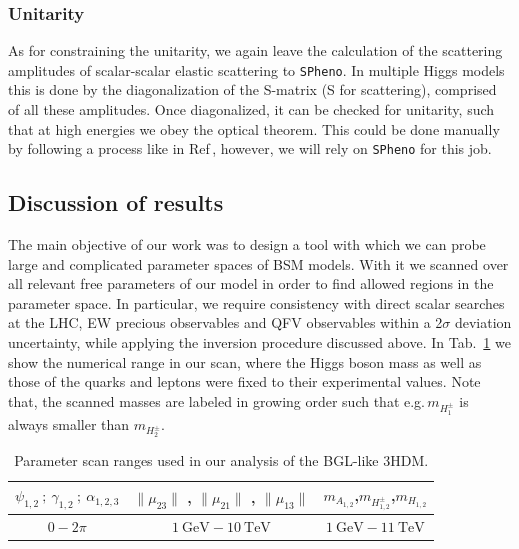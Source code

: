 \documentclass[10pt]{report}
\begin{document}
\subsubsection{Unitarity}

As for constraining the unitarity, we again leave the calculation of the scattering amplitudes of scalar-scalar elastic scattering to \texttt{SPheno}. 
%
In multiple Higgs models this is done by the diagonalization of the S-matrix (S for scattering), comprised of all these amplitudes.
%
Once diagonalized, it can be checked for unitarity, such that at high energies we obey the optical theorem.  
%
This could be done manually by following a process like in Ref\,\cite{Moretti_2015}, however, we will rely on \texttt{SPheno} for this job.

\subsection{Discussion of results}

The main objective of our work was to design a tool with which we can probe large and complicated parameter spaces of BSM models. 
%
With it we scanned over all relevant free parameters of our model in order to find allowed regions in the parameter space.
%
In particular, we require consistency with direct scalar searches at the LHC, EW precious observables and QFV observables within a 2$\sigma$ deviation uncertainty, while applying the inversion procedure discussed above. 
%
In Tab.~\ref{Tab:Generic_3HDM_tab} we show the numerical range in our scan, where the Higgs boson mass as well as those of the quarks and leptons were fixed to their experimental values. 
%
Note that, the scanned masses are labeled in growing order such that e.g.\,$m_{H_1^\pm}$ is always smaller than $m_{H_2^\pm}$.  
%
\begin{table}[hb]
	\centering
	\begin{tabular}{ccc}
		$\psi_{1,2} \ ; \ \gamma_{1,2} \ ;\  \alpha_{1,2,3}$ & $\|\mu_{23}\|$ , $\|\mu_{21}\|$ , $\|\mu_{13}\|$ &  $m_{A_{1,2}}$,$m_{H_{1,2}^\pm}$,$m_{H_{1,2}}$ \\ \hline
		$0- 2\pi$    & $1 \ \text{GeV} - 10 \ \text{TeV}$ & $1 \ \text{GeV} - 11 \ \text{TeV}$   
	\end{tabular}
	\caption{Parameter scan ranges used in our analysis of the BGL-like 3HDM.}
	\label{Tab:Generic_3HDM_tab}
\end{table}
%
\end{document}
